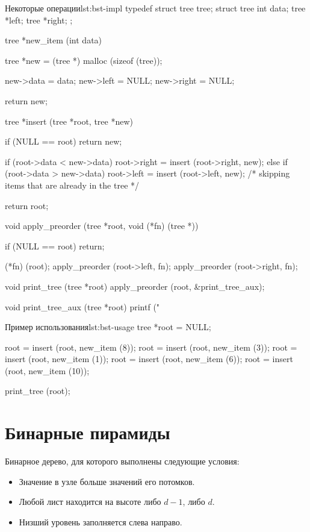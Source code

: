\begin{clst}{Некоторые операции}{lst:bst-impl}
typedef struct tree tree;
struct tree {
  int data;
  tree *left;
  tree *right;
};

tree *new_item (int data) {
  tree *new = (tree *) malloc (sizeof (tree));

  new->data = data;
  new->left = NULL;
  new->right = NULL;

  return new;
}

tree *insert (tree *root, tree *new) {
  if (NULL == root)
    return new;

  if (root->data < new->data)
    root->right = insert (root->right, new);
  else if (root->data > new->data)
    root->left = insert (root->left, new);
  /* skipping items that are already in the tree */

  return root;
}

void apply_preorder (tree *root, void (*fn) (tree *)) {
  if (NULL == root)
    return;

  (*fn) (root);
  apply_preorder (root->left, fn);
  apply_preorder (root->right, fn);
}

void print_tree (tree *root) {
  apply_preorder (root, &print_tree_aux);
}

void print_tree_aux (tree *root) {
  printf ("%
}
\end{clst}

\begin{clst}{Пример использования}{lst:bst-usage}
tree *root = NULL;

root = insert (root, new_item (8));
root = insert (root, new_item (3));
root = insert (root, new_item (1));
root = insert (root, new_item (6));
root = insert (root, new_item (10));

print_tree (root);
\end{clst}

\section{Бинарные пирамиды}
\label{sec:bin-heaps}

Бинарное дерево, для которого выполнены следующие условия:
\begin{itemize}
  \item Значение в узле больше значений его потомков.
  \item Любой лист находится на высоте либо $d - 1$, либо $d$.
  \item Низший уровень заполняется слева направо.
\end{itemize}

